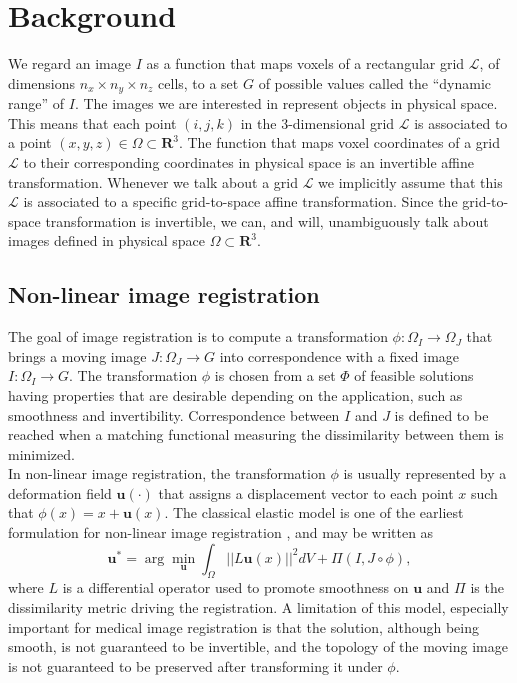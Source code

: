 \section{Background}
We regard an image $I$ as a function that maps voxels of a rectangular grid \hbox{$\mathcal{L}$}, of dimensions $n_{x} \times n_{y} \times n_{z}$ cells, to a set $G$ of
possible values called the ``dynamic range'' of $I$. The images we are interested in represent objects in physical space. This means that each point $(i,j,k)$ in the
3-dimensional grid $\mathcal{L}$ is associated to a point $(x,y,z) \in \Omega \subset \mathbf{R}^{3}$. The function that maps voxel coordinates of a grid $\mathcal{L}$ to their corresponding coordinates in physical space is an invertible affine transformation. Whenever we talk about a grid $\mathcal{L}$ we implicitly assume that this $\mathcal{L}$ is associated to a specific grid-to-space affine transformation. Since the grid-to-space transformation is invertible, we can, and will, unambiguously talk about images defined in physical space $\Omega \subset \mathbf{R}^{3}$.\\

\vspace{-0.5cm}
\subsection{Non-linear image registration}\label{sec:non_linear_image_registration}
The goal of image registration is to compute a transformation $\phi: \Omega_{I} \rightarrow \Omega_{J}$ that brings a moving image $J:\Omega_{J} \rightarrow G$ into correspondence
with a fixed image $I:\Omega_{I} \rightarrow G$. The transformation $\phi$ is chosen from a set $\Phi$ of feasible solutions having properties that are desirable depending on the
application, such as smoothness and invertibility. Correspondence between $I$ and $J$ is defined to be reached when a matching functional measuring the dissimilarity between them is minimized.\\

In non-linear image registration, the transformation $\phi$ is usually represented by a deformation field $\mathbf{u(\cdot)}$ that assigns a displacement vector
to each point $x$ such that $\phi(x) = x + \mathbf{u}(x)$. The classical elastic model is one of the earliest formulation for non-linear image registration \citep{Bajcsy1982, Gee1999}, and may be written as
\begin{equation}\label{eq:elastic}
    \mathbf{u}^{*} = \arg \min_{\mathbf{u}} \int_{\Omega} ||L \mathbf{u}(x)||^{2}dV + \Pi(I, J \circ \phi),
\end{equation}
where $L$ is a differential operator used to promote smoothness on $\mathbf{u}$ and $\Pi$ is the dissimilarity metric driving the registration. A limitation of this model, especially important for medical image registration is that the solution, although being smooth, is not guaranteed to be invertible, and the topology of the moving image is not guaranteed to be preserved after transforming it under $\phi$.\\


